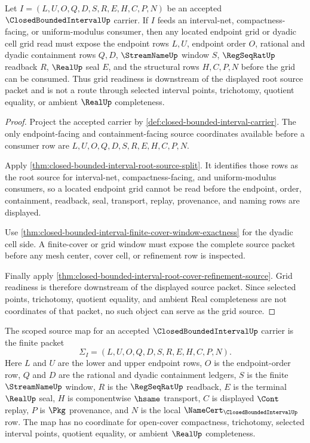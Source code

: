 \begin{theorem}
\label{thm:closed-bounded-interval-root-located-endpoint-grid}
Let $I=(L,U,O,Q,D,S,R,E,H,C,P,N)$ be an accepted $\ClosedBoundedIntervalUp$ carrier. If $I$ feeds an interval-net, compactness-facing, or uniform-modulus consumer, then any located endpoint grid or dyadic cell grid read must expose the endpoint rows $L,U$, endpoint order $O$, rational and dyadic containment rows $Q,D$, $\StreamNameUp$ window $S$, $\RegSeqRatUp$ readback $R$, $\RealUp$ seal $E$, and the structural rows $H,C,P,N$ before the grid can be consumed. Thus grid readiness is downstream of the displayed root source packet and is not a route through selected interval points, trichotomy, quotient equality, or ambient $\RealUp$ completeness.
\end{theorem}
\begin{proof}
Project the accepted carrier by \autoref{def:closed-bounded-interval-carrier}. The only endpoint-facing and containment-facing source coordinates available before a consumer row are $L,U,O,Q,D,S,R,E,H,C,P,N$.

Apply \autoref{thm:closed-bounded-interval-root-source-split}. It identifies those rows as the root source for interval-net, compactness-facing, and uniform-modulus consumers, so a located endpoint grid cannot be read before the endpoint, order, containment, readback, seal, transport, replay, provenance, and naming rows are displayed.

Use \autoref{thm:closed-bounded-interval-finite-cover-window-exactness} for the dyadic cell side. A finite-cover or grid window must expose the complete source packet before any mesh center, cover cell, or refinement row is inspected.

Finally apply \autoref{thm:closed-bounded-interval-root-cover-refinement-source}. Grid readiness is therefore downstream of the displayed source packet. Since selected points, trichotomy, quotient equality, and ambient Real completeness are not coordinates of that packet, no such object can serve as the grid source.
\end{proof}

\begin{definition}
\label{def:closed-bounded-interval-scoped-source-map}
The scoped source map for an accepted $\ClosedBoundedIntervalUp$ carrier is the finite packet
$$
\Sigma_I=(L,U,O,Q,D,S,R,E,H,C,P,N).
$$
Here $L$ and $U$ are the lower and upper endpoint rows, $O$ is the endpoint-order row, $Q$ and $D$ are the rational and dyadic containment ledgers, $S$ is the finite $\StreamNameUp$ window, $R$ is the $\RegSeqRatUp$ readback, $E$ is the terminal $\RealUp$ seal, $H$ is componentwise $\hsame$ transport, $C$ is displayed $\Cont$ replay, $P$ is $\Pkg$ provenance, and $N$ is the local $\NameCert_{\ClosedBoundedIntervalUp}$ row. The map has no coordinate for open-cover compactness, trichotomy, selected interval points, quotient equality, or ambient $\RealUp$ completeness.
\end{definition}

